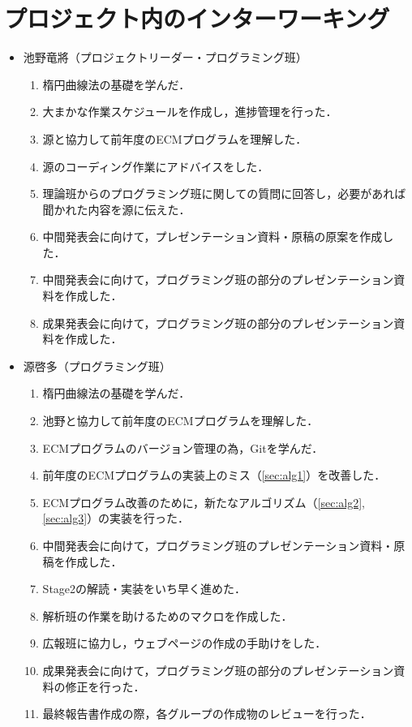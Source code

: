 \documentclass[openany,11pt,papersize]{jsbook}
\begin{document}
\chapter{プロジェクト内のインターワーキング}
\begin{itemize}
\item 池野竜將（プロジェクトリーダー・プログラミング班）
 \begin{enumerate}
 \renewcommand{\labelenumi}{(\arabic{enumi})}
 \item 楕円曲線法の基礎を学んだ．
 \item 大まかな作業スケジュールを作成し，進捗管理を行った．
 \item 源と協力して前年度のECMプログラムを理解した．
 \item 源のコーディング作業にアドバイスをした．
 \item 理論班からのプログラミング班に関しての質問に回答し，必要があれば聞かれた内容を源に伝えた．
 \item 中間発表会に向けて，プレゼンテーション資料・原稿の原案を作成した．
 \item 中間発表会に向けて，プログラミング班の部分のプレゼンテーション資料を作成した．
 \item 成果発表会に向けて，プログラミング班の部分のプレゼンテーション資料を作成した．
 \end{enumerate}
 
\item 源啓多（プログラミング班）
 \begin{enumerate}
 \renewcommand{\labelenumi}{(\arabic{enumi})}
 \item 楕円曲線法の基礎を学んだ．
 \item 池野と協力して前年度のECMプログラムを理解した．
 \item ECMプログラムのバージョン管理の為，Gitを学んだ．
 \item 前年度のECMプログラムの実装上のミス（\ref{sec:alg1}）を改善した．
 \item ECMプログラム改善のために，新たなアルゴリズム（\ref{sec:alg2}, \ref{sec:alg3}）の実装を行った．
 \item 中間発表会に向けて，プログラミング班のプレゼンテーション資料・原稿を作成した．
 \item Stage2の解読・実装をいち早く進めた．
 \item 解析班の作業を助けるためのマクロを作成した．
 \item 広報班に協力し，ウェブページの作成の手助けをした．
 \item 成果発表会に向けて，プログラミング班の部分のプレゼンテーション資料の修正を行った．
 \item 最終報告書作成の際，各グループの作成物のレビューを行った．
 \end{enumerate}
 

\end{itemize}
\end{document}

